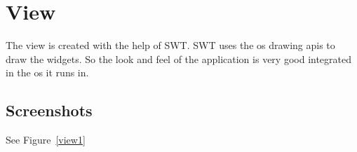 
\section{View} %
\label{sec:view}

The view is created with the help of SWT. SWT uses the os drawing apis to draw the widgets. So the look and feel of the application is very good integrated in the os it runs in. 

\subsection{Screenshots} %
\label{sub:screenshots}
See Figure~\ref{view1}
%
%

